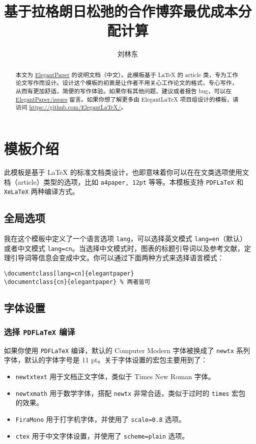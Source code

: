 \documentclass[lang=cn]{elegantpaper}
\title{基于拉格朗日松弛的合作博弈最优成本分配计算}
\author{刘林东}
\begin{document}
\begin{abstract}
\noindent 本文为 \href{https://github.com/ElegantLaTeX/ElegantPaper/}{ElegantPaper} 的说明文档（中文）。此模板基于 \LaTeX{} 的 article 类，专为工作论文写作而设计。设计这个模板的初衷是让作者不用关心工作论文的格式，专心写作，从而有更加舒适，简便的写作体验。如果你有其他问题、建议或者报告 bug，可以在 \href{https://github.com/ElegantLaTeX/ElegantPaper/issues}{ElegantPaper/issues} 留言。如果你想了解更多由 Elegant\LaTeX{} 项目组设计的模板，请访问 \href{https://github.com/ElegantLaTeX/}{https://github.com/ElegantLaTeX/}。
\end{abstract}

\section{模板介绍}

此模板是基于 \LaTeX{} 的标准文档类设计，也即意味着你可以在在文类选项使用文档（article）类型的选项，比如 \lstinline{a4paper, 12pt} 等等。本模板支持 \lstinline{PDFLaTeX} 和 \lstinline{XeLaTeX} 两种编译方式。

\subsection{全局选项}
我在这个模板中定义了一个语言选项 \lstinline{lang}，可以选择英文模式 \lstinline{lang=en}（默认）或者中文模式 \lstinline{lang=cn}。当选择中文模式时，图表的标题引导词以及参考文献，定理引导词等信息会变成中文。你可以通过下面两种方式来选择语言模式：
\begin{lstlisting}
\documentclass[lang=cn]{elegantpaper}
\documentclass{cn}{elegantpaper} % 两者皆可
\end{lstlisting}

\subsection{字体设置}
\subsubsection[选择 PDFLaTeX 编译]{选择 \lstinline{PDFLaTeX} 编译}
如果你使用 \lstinline{PDFLaTeX} 编译，默认的 Computer Modern 字体被换成了 \lstinline{newtx} 系列字体，默认的字体字号是 11 pt。关于字体设置的宏包主要用到了：
\begin{itemize}
	\item \lstinline{newtxtext} 用于文档正文字体，类似于 Times New Roman 字体。
	\item \lstinline{newtxmath} 用于数学字体，搭配 \lstinline{newtx} 非常合适，类似于过时的 \lstinline{times} 宏包的效果。
	\item \lstinline{FiraMono} 用于打字机字体，并使用了 \lstinline{scale=0.8} 选项。
	\item \lstinline{ctex} 用于中文字体设置，并使用了 \lstinline{scheme=plain} 选项。
\end{itemize}
\end{document}
